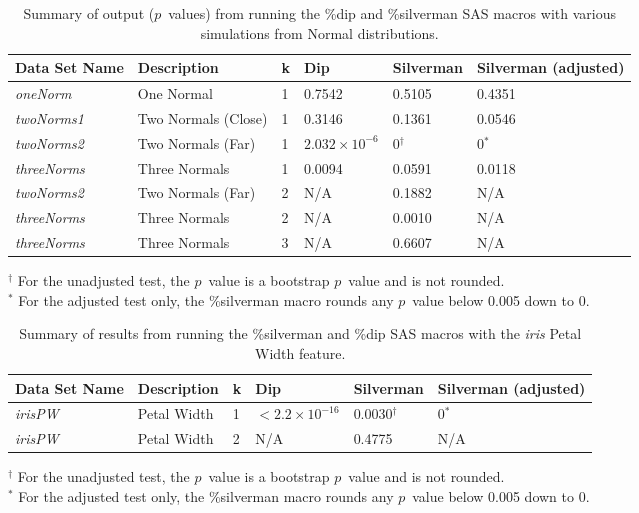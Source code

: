 \documentclass[]{interact}
\theoremstyle{plain}%
\theoremstyle{definition}
\theoremstyle{remark}
\begin{document}
\begin{table}
\begin{tabularx}{\textwidth}{|X|l|l|l|l|p{57pt}|}
\hline
\textbf{Data Set Name} & \textbf{Description} & \textbf{k} & \textbf{Dip} & \textbf{Silverman} & \textbf{Silverman (adjusted)} \\
\hline
\textit{oneNorm} & One Normal & 1 & 0.7542 & 0.5105 & 0.4351 \\
\hline
\textit{twoNorms1} & Two Normals (Close) & 1 & 0.3146 & 0.1361 & 0.0546 \\
\hline
\textit{twoNorms2} & Two Normals (Far) & 1 & $2.032\times10^{-6}$ & 0$^\dag$ & 0$^*$ \\
\hline
\textit{threeNorms} & Three Normals & 1 & 0.0094 & 0.0591 & 0.0118 \\
\hline
\hline
\textit{twoNorms2} & Two Normals (Far) & 2 & N/A & 0.1882 & N/A \\
\hline
\textit{threeNorms} & Three Normals & 2 & N/A & 0.0010 & N/A \\
\hline
\textit{threeNorms} & Three Normals & 3 & N/A & 0.6607 & N/A \\
\hline
\end{tabularx}
\caption{Summary of output ($p$~values) from running the \%dip and \%silverman SAS macros with various simulations from Normal distributions. \label{ex:ex1}}
$^\dag$ For the unadjusted test, the $p$~value is a bootstrap $p$~value and is not rounded. \\
$^*$ For the adjusted test only, the \%silverman macro rounds any $p$~value below 0.005 down to 0.
\end{table}

\clearpage



\begin{table}
\begin{tabularx}{\textwidth}{|X|p{85pt}|l|l|l|p{60pt}|}
\hline
\textbf{Data Set Name} & \textbf{Description} & \textbf{k} & \textbf{Dip} & \textbf{Silverman} & \textbf{Silverman (adjusted)} \\
\hline
\textit{irisPW} & Petal Width & 1 & $<2.2\times10^{-16}$ & 0.0030$^\dag$ & 0$^*$ \\
\hline 
\textit{irisPW} & Petal Width & 2 & N/A & 0.4775 & N/A \\
\hline
\end{tabularx}
\caption{Summary of results from running the \%silverman and \%dip SAS macros with the \textit{iris} Petal Width feature. \label{ex:ex2}} 
$^\dag$ For the unadjusted test, the $p$~value is a bootstrap $p$~value and is not rounded. \\
$^*$ For the adjusted test only, the \%silverman macro rounds any $p$~value below 0.005 down to 0.
\end{table}
\end{document}
